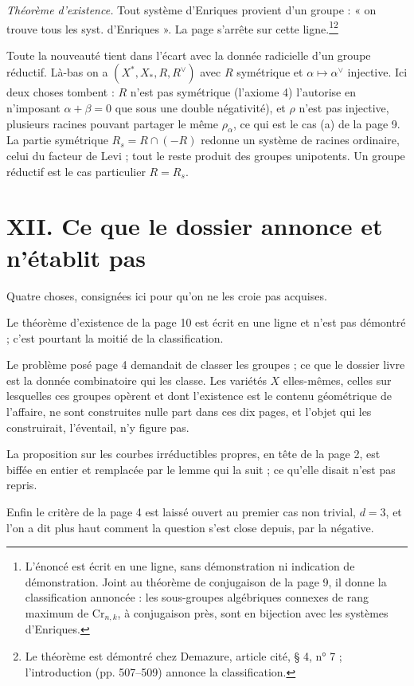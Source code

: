 \documentclass[11pt,a4paper]{article}
\begin{document}
\emph{Théorème d'existence.} Tout système d'Enriques provient d'un groupe :
« on trouve tous les syst. d'Enriques ». La page s'arrête sur cette
ligne.\footnote{L'énoncé est écrit en une ligne, sans démonstration ni
indication de démonstration. Joint au théorème de conjugaison de la page 9, il
donne la classification annoncée : les sous-groupes algébriques connexes de
rang maximum de $\mathrm{Cr}_{n,k}$, à conjugaison près, sont en bijection avec
les systèmes d'Enriques.}\footnote{Le théorème est démontré chez Demazure,
article cité, § 4, n° 7 ; l'introduction (pp. 507--509) annonce la
classification.}

Toute la nouveauté tient dans l'écart avec la donnée radicielle d'un groupe
réductif. Là-bas on a $(X^*,
X_*, R, R^\vee)$ avec $R$ symétrique et $\alpha \mapsto \alpha^\vee$ injective.
Ici deux choses tombent : $R$ n'est pas symétrique (l'axiome 4) l'autorise en
n'imposant $\alpha + \beta = 0$ que sous une double négativité), et
$\rho$ n'est pas injective, plusieurs racines pouvant partager le même
$\rho_\alpha$, ce qui est le cas (a) de la page 9. La partie symétrique $R_s =
R \cap (-R)$ redonne un système de racines ordinaire, celui du facteur de Levi ;
tout le reste produit des groupes unipotents. Un groupe réductif est le cas
particulier $R = R_s$.

\section*{XII. Ce que le dossier annonce et n'établit pas}

Quatre choses, consignées ici pour qu'on ne les croie pas acquises.

Le théorème d'existence de la page 10 est écrit en une ligne et n'est pas
démontré ; c'est pourtant la moitié de la classification.

Le problème posé page 4 demandait de classer les groupes ; ce que le dossier
livre est la donnée combinatoire qui les classe. Les variétés $X$ elles-mêmes,
celles sur lesquelles ces groupes opèrent et dont l'existence est le contenu
géométrique de l'affaire, ne sont construites nulle part dans ces dix pages,
et l'objet qui les construirait, l'éventail, n'y figure pas.

La proposition sur les courbes irréductibles propres, en tête de la page 2, est
biffée en entier et remplacée par le lemme qui la suit ; ce qu'elle disait
n'est pas repris.

Enfin le critère de la page 4 est laissé ouvert au premier cas non trivial, $d
= 3$, et l'on a dit plus haut comment la question s'est close depuis, par la
négative.
\end{document}
